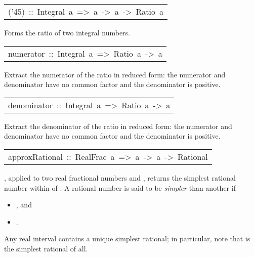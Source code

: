 \begin{haddockdesc}
\item[\begin{tabular}{@{}l}
({\char '45})\ ::\ Integral\ a\ =>\ a\ ->\ a\ ->\ Ratio\ a
\end{tabular}]\haddockbegindoc
Forms the ratio of two integral numbers.
\par

\end{haddockdesc}
\begin{haddockdesc}
\item[\begin{tabular}{@{}l}
numerator\ ::\ Integral\ a\ =>\ Ratio\ a\ ->\ a
\end{tabular}]\haddockbegindoc
Extract the numerator of the ratio in reduced form:
 the numerator and denominator have no common factor and the denominator
 is positive.
\par

\end{haddockdesc}
\begin{haddockdesc}
\item[\begin{tabular}{@{}l}
denominator\ ::\ Integral\ a\ =>\ Ratio\ a\ ->\ a
\end{tabular}]\haddockbegindoc
Extract the denominator of the ratio in reduced form:
 the numerator and denominator have no common factor and the denominator
 is positive.
\par

\end{haddockdesc}
\begin{haddockdesc}
\item[\begin{tabular}{@{}l}
approxRational\ ::\ RealFrac\ a\ =>\ a\ ->\ a\ ->\ Rational
\end{tabular}]\haddockbegindoc
{}, applied to two real fractional numbers  and ,
 returns the simplest rational number within  of .
 A rational number  is said to be \emph{simpler} than another  if
\par
\begin{itemize}
\item
 , and
\par

\item
 .
\par

\end{itemize}
Any real interval contains a unique simplest rational;
 in particular, note that  is the simplest rational of all.
\par

\end{haddockdesc}
